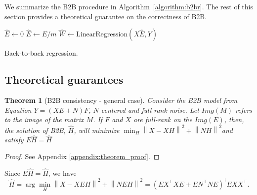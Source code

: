 \documentclass[preprint,12pt,3p]{elsarticle}
\newtheorem{theorem}{Theorem}
\begin{document}
%

We summarize the B2B procedure in Algorithm~\ref{algorithm:b2br}.
%
The rest of this section provides a theoretical guarantee on the correctness of
B2B.


\begin{algorithm}[H]
    $\hat{E} \leftarrow 0$\;
    $\hat{E} \leftarrow \hat{E} / m$\;
    $\hat{W} \leftarrow \text{LinearRegression}(X \hat{E}, Y)$\;
    \caption{Back-to-back regression.}
    \label{algorithm:b2br}
\end{algorithm}

\subsection{Theoretical guarantees}
\label{sec:theorem}

\begin{theorem}[B2B consistency - general case]

     Consider the B2B model from Equation $Y = (XE + N)F$, $N$ centered and full
     rank noise.
     Let $Img(M)$ refers to the image of the matrix $M$. If $F$ and $X$ are
     full-rank on the $Img(E)$, then, the solution of B2B, $\hat H$, will
     minimize
     $\min_H  \left \| X - XH\right\| ^2  + \left \| NH\right \| ^2$and satisfy $E\hat H = \hat H$
\end{theorem}
%
\begin{proof}
  See Appendix \ref{appendix:theorem_proof}.
\end{proof}

Since  $E\hat H = \hat H$, we have
\begin{equation}
  \hat H = \arg \min_H  \left \| X - XEH\right\| ^2  + \left \| NEH\right \| ^2 = (E X^\top XE +EN^\top NE) ^\dagger EXX^\top.
\end{equation}
\end{document}
